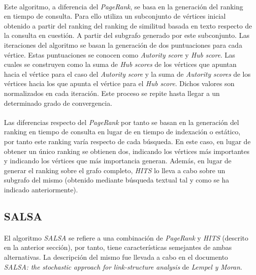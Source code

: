 \documentclass{subfiles}
\begin{document}
        \paragraph{}
        Este algoritmo, a diferencia del \emph{PageRank}, se basa en la generación del ranking en tiempo de consulta. Para ello utiliza un subconjunto de vértices inicial obtenido a partir del ranking del ranking de similitud basada en texto respecto de la consulta en cuestión. A partir del subgrafo generado por este subconjunto. Las iteraciones del algoritmo se basan la generación de dos puntuaciones para cada vértice. Estas puntuaciones se conocen como \emph{Autority score} y \emph{Hub score}. Las cuales se construyen como la suma de \emph{Hub scores} de los vértices que apuntan hacia el vértice para el caso del \emph{Autority score} y la suma de \emph{Autority scores} de los vértices hacia los que apunta el vértice para el \emph{Hub score}. Dichos valores son normalizados en cada iteración. Este proceso se repite hasta llegar a un determinado grado de convergencia.

        \paragraph{}
        Las diferencias respecto del \emph{PageRank} por tanto se basan en la generación del ranking en tiempo de consulta en lugar de en tiempo de indexación o estático, por tanto este ranking varía respecto de cada búsqueda. En este caso, en lugar de obtener un único ranking se obtienen dos, indicando los vértices más importantes y indicando los vértices que más importancia generan. Además, en lugar de generar el ranking sobre el grafo completo, \emph{HITS} lo lleva a cabo sobre un subgrafo del mismo (obtenido mediante búsqueda textual tal y como se ha indicado anteriormente).

      \subsection{SALSA}
      \label{sec:salsa}

        \paragraph{}
        El algoritmo \emph{SALSA} se refiere a una combinación de \emph{PageRank} y \emph{HITS} (descrito en la anterior sección), por tanto, tiene características semejantes de ambas alternativas. La descripción del mismo fue llevada a cabo en el documento \emph{SALSA: the stochastic approach for link-structure analysis}\cite{lempel2001salsa} de \emph{Lempel y Moran}.
\end{document}
